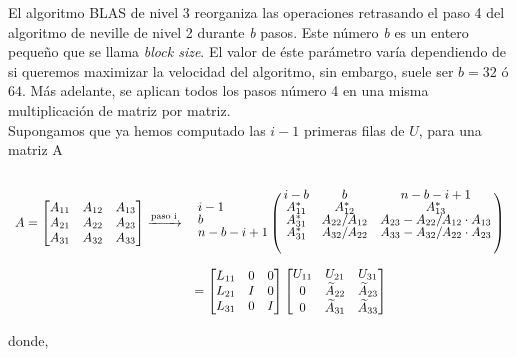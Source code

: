 \documentclass[a4paper,12pt]{article}
\begin{document}
El algoritmo BLAS de nivel 3 reorganiza las operaciones retrasando el paso 4 del algoritmo de neville de nivel 2 durante \textit{b} pasos. Este n\'umero \textit{b} es un entero peque\~no que se llama \textit{block size}. El valor de \'este par\'ametro var\'ia dependiendo de si queremos maximizar la velocidad del algoritmo, sin embargo, suele ser $b=32$ \'o $64$. M\'as adelante, se aplican todos los pasos n\'umero 4 en una misma multiplicaci\'on de matriz por matriz.\\

Supongamos que ya hemos computado las $i-1$ primeras filas de $U$, para una matriz A

\begin{equation}
\begin{array}{l l}
  		A = 
  		\begin{bmatrix}
			A_{11} & A_{12} & A_{13} \\
			A_{21} & A_{22} & A_{23} \\
			A_{31} & A_{32} & A_{33}  		
  		\end{bmatrix}
  		\xrightarrow{\text{paso i}} &
  		\bordermatrix{
  				 	& i-b & b & n-b-i+1 \cr
                	i-1     & A_{11}^{*} & A_{12}^{*} & A_{13}^{*}\\
                	b       & A_{31}^{*} & A_{22}/A_{12} & A_{23} - A_{22}/A_{12}\cdot A_{13} \\
                	n-b-i+1 & A_{31}^{*} & A_{32}/A_{22} & A_{33} - A_{32}/A_{22}\cdot A_{23}
                }\\[1cm]
	  \, & = 
	  \begin{bmatrix}
			L_{11} & 0 & 0 \\
			L_{21} & I & 0 \\
			L_{31} & 0 & I	  	
	  \end{bmatrix}
	  \begin{bmatrix}
			U_{11} & U_{21} & U_{31} \\
			0 & \widetilde{A}_{22} & \widetilde{A}_{23} \\
			0 & \widetilde{A}_{31} & \widetilde{A}_{33}
	  \end{bmatrix}\\
\end{array}
\end{equation}

donde,
\end{document}
